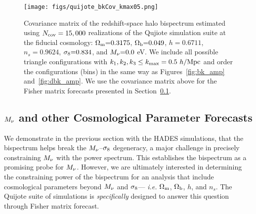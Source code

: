 \begin{figure}
\begin{center}
    \texttt{[image: figs/quijote\_bkCov\_kmax05.png]} 
    \caption{Covariance matrix of the redshift-space halo bispectrum estimated 
    using $N_{\rm cov} = 15,000$ realizations of the Qujiote simulation suite at 
    the fiducial cosmology: $\Omega_{\rm m}{=}0.3175$, $\Omega_{\rm b}{=}0.049$, $h{=}0.6711$, $n_s{=}0.9624$, $\sigma_8{=}0.834$, 
    and $M_\nu{=}0.0$ eV. We include all possible triangle configurations with 
    $k_1, k_2, k_3 \leq k_{\rm max} = 0.5~h/{\rm Mpc}$ and order the configurations 
    (bins) in the same way as Figures~\ref{fig:bk_amp} and~\ref{fig:dbk_amp}. We 
    use the covariance matrix above for the Fisher matrix forecasts presented in 
    Section~\ref{sec:forecasts}. 
    }
\label{fig:bk_cov}
\end{center}
\end{figure}


\subsection{$M_\nu$ and other Cosmological Parameter Forecasts} \label{sec:forecasts}
We demonstrate in the previous section with the HADES simulations, that 
the bispectrum helps break the $M_\nu$--$\sigma_8$ degeneracy, a major 
challenge in precisely constraining $M_\nu$ with the power spectrum. 
This establishes the bispectrum as a promising probe for $M_\nu$. However, 
we are ultimately interested in determining the constraining power of the 
bispectrum for an analysis that include cosmological parameters beyond 
$M_\nu$ and $\sigma_8$--- \emph{i.e.} $\Omega_{\rm m}$, $\Omega_{\rm b}$, $h$, and $n_s$. The Quijote 
suite of simulations is \emph{specifically} designed to answer this question
through Fisher matrix forecast.

